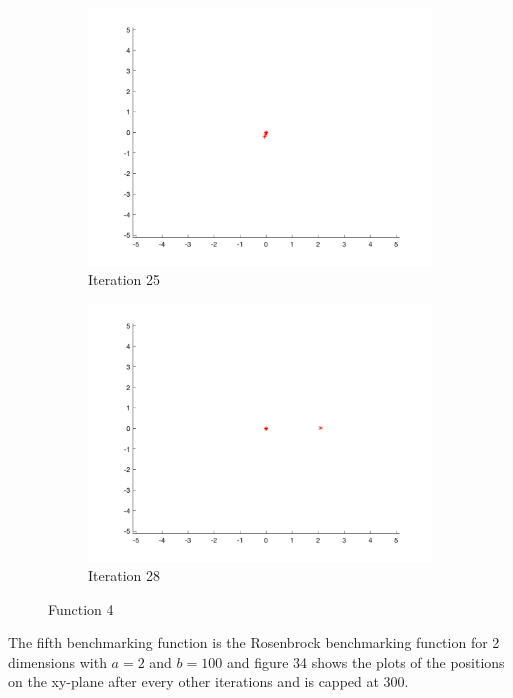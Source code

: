 \begin{figure}
\begin{subfigure}[b]{0.4\textwidth}
    \includegraphics[width=\textwidth]{img/smpl/rast2d/loa-iter-25}
    \caption{Iteration 25}
    \label{fig:s4-iter-6}
  \end{subfigure}
  \begin{subfigure}[b]{0.4\textwidth}
    \includegraphics[width=\textwidth]{img/smpl/rast2d/loa-iter-28}
    \caption{Iteration 28}
    \label{fig:s4-iter-7}
  \end{subfigure}
  \caption{Function 4}
\end{figure}


The fifth benchmarking function is the Rosenbrock benchmarking function for 2 dimensions with $a = 2$ and $b=100$ and figure 34 shows the plots of the positions on the xy-plane after every other iterations and is capped at 300.

